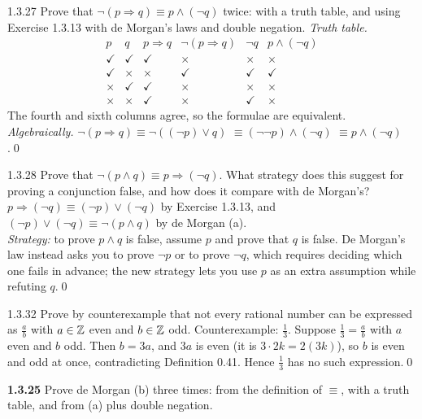 \begin{bookex}[essential]{1.3.27}
Prove that $\neg(p\Rightarrow q)\equiv p\wedge(\neg q)$ twice: with a truth table, and using Exercise 1.3.13 with de Morgan's laws and double negation.
\solution
\emph{Truth table.}
\[
\begin{array}{cc|cc|cc}
p&q&p\Rightarrow q&\neg(p\Rightarrow q)&\neg q&p\wedge(\neg q)\\\hline
\checkmark&\checkmark&\checkmark&\times&\times&\times\\
\checkmark&\times&\times&\checkmark&\checkmark&\checkmark\\
\times&\checkmark&\checkmark&\times&\times&\times\\
\times&\times&\checkmark&\times&\checkmark&\times
\end{array}
\]
The fourth and sixth columns agree, so the formulae are equivalent.\\
\emph{Algebraically.} $\neg(p\Rightarrow q)\equiv\neg((\neg p)\vee q)$  $\equiv(\neg\neg p)\wedge(\neg q)$  $\equiv p\wedge(\neg q)$ .\qed
\end{bookex}

\begin{bookex}{1.3.28}
Prove that $\neg(p\wedge q)\equiv p\Rightarrow(\neg q)$. What strategy does this suggest for proving a conjunction false, and how does it compare with de Morgan's?
\solution
$p\Rightarrow(\neg q)\equiv(\neg p)\vee(\neg q)$ by Exercise 1.3.13, and $(\neg p)\vee(\neg q)\equiv\neg(p\wedge q)$ by de Morgan (a). \\
\emph{Strategy:} to prove $p\wedge q$ is false, assume $p$ and prove that $q$ is false. De Morgan's law instead asks you to prove $\neg p$ or to prove $\neg q$, which requires deciding which one fails in advance; the new strategy lets you use $p$ as an extra assumption while refuting $q$.\qed
\end{bookex}

\begin{bookex}[recommended]{1.3.32}
Prove by counterexample that not every rational number can be expressed as $\frac ab$ with $a\in\mathbb{Z}$ even and $b\in\mathbb{Z}$ odd.
\solution
Counterexample: $\frac13$. Suppose $\frac13=\frac ab$ with $a$ even and $b$ odd. Then $b=3a$, and $3a$ is even (it is $3\cdot2k=2(3k)$), so $b$ is even and odd at once, contradicting Definition 0.41. Hence $\frac13$ has no such expression.\qed
\end{bookex}

\begin{trybox}[{1.3.25 \fO}]
\textbf{1.3.25} Prove de Morgan (b) three times: from the definition of $\equiv$, with a truth table, and from (a) plus double negation.
\end{trybox}

